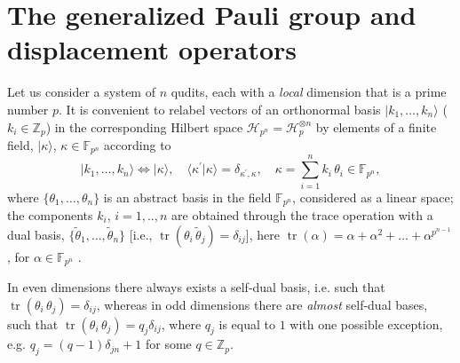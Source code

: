 \documentclass{article}
\DeclareMathOperator{\tr}{tr}
\begin{document}
\section{The generalized Pauli group and displacement operators}

Let us consider a system of $n$ qudits, each with a \textit{local} dimension
that is a prime number $p$. It is convenient to relabel vectors of an
orthonormal basis $|k_{1},\ldots ,k_{n}\rangle $ ($k_{i}\in \mathbb{Z}_{p}$) in
the corresponding Hilbert space $\mathcal{H}_{p^{n}}=\mathcal{H}_{p}^{\otimes
n}$ by elements of a finite field, $|\kappa \rangle $, $\kappa \in \mathbb{F}%
_{p^{n}}$ according to 
\begin{equation}
  |k_{1},\ldots ,k_{n}\rangle \Leftrightarrow |\kappa \rangle,
  \quad \langle
  \kappa^{\prime}|\kappa \rangle =\delta _{\kappa ^{\prime },\kappa },
  \quad
  \kappa =\sum_{i=1}^{n}k_{i}\,\theta _{i}\in \mathbb{F}_{p^{n}},
  \label{basis}
\end{equation}%
where $\{\theta_{1},\ldots ,\theta_{n}\}$ is an abstract basis in the
field $\mathbb{F}_{p^{n}}$, considered as a linear space; the components
$k_{i}$, $i=1,..,n$ are obtained through the trace operation with a dual basis,
$\{\tilde{\theta}_{1},\ldots ,\tilde{\theta}_{n}\}$ [i.e., $\tr(\theta
_{i}\,\tilde{\theta}_{j})=\delta _{ij}$], here $\tr(\alpha )=\alpha +\alpha
^{2}+\ldots +\alpha ^{p^{n-1}}$, for $\alpha \in \mathbb{F}_{p^{n}}$ \cite{FF}.

In even dimensions there always exists a self-dual basis, i.e. such that
$\tr(\theta _{i}\,\theta _{j})=\delta _{ij}$, whereas in odd dimensions there
are \textit{almost} self-dual bases, such that $\tr(\theta _{i}\,\theta
_{j})=q_{j}\delta _{ij}$, where $q_{j}$ is equal to $1$ with one possible
exception, e.g. $q_{j}=(q-1)\delta_{jn}+1$ for some $q \in \mathbb Z_p$.
\end{document}
